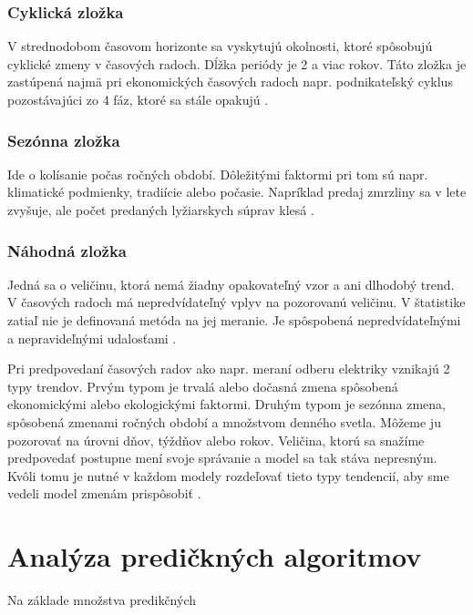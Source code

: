 \documentclass[12pt,oneside,slovak,a4paper]{book}
\begin{document}
\subsection{Cyklická zložka}
V strednodobom časovom horizonte sa vyskytujú okolnosti, ktoré spôsobujú
cyklické zmeny v časových radoch. Dĺžka periódy je 2 a viac rokov. Táto zložka
je zastúpená najmä pri ekonomických časových radoch napr. podnikateľský cyklus
pozostávajúci zo 4 fáz, ktoré sa stále opakujú \cite{Agrawal2013}.

\subsection{Sezónna zložka}
Ide o kolísanie počas ročných období. Dôležitými faktormi pri tom sú napr.
klimatické podmienky, tradiície alebo počasie. Napríklad predaj zmrzliny sa
v lete zvyšuje, ale počet predaných lyžiarskych súprav klesá \cite{Agrawal2013}.

\subsection{Náhodná zložka}
Jedná sa o veličinu, ktorá nemá žiadny opakovateľný vzor a ani dlhodobý trend.
V časových radoch má nepredvídateľný vplyv na pozorovanú veličinu. V štatistike
zatiaľ nie je definovaná metóda na jej meranie. Je spôspobená nepredvídateľnými
a nepravideľnými udalosťami \cite{Agrawal2013}.

Pri predpovedaní časových radov ako napr. meraní odberu elektriky vznikajú
2 typy trendov. Prvým typom je trvalá alebo dočasná zmena spôsobená
ekonomickými alebo ekologickými faktormi. Druhým typom je sezónna zmena,
spôsobená zmenami ročných období a množstvom denného svetla. Môžeme ju pozorovať
na úrovni dňov, týždňov alebo rokov. Veličina, ktorú sa snažíme predpovedať
postupne mení svoje správanie a model sa tak stáva nepresným. Kvôli tomu je
nutné v každom modely rozdeľovať tieto typy tendencií, aby sme vedeli model
zmenám prispôsobiť \cite{Grmanova2016}.



\chapter{Analýza predičkných algoritmov}
Na základe množstva predikčných
\end{document}

